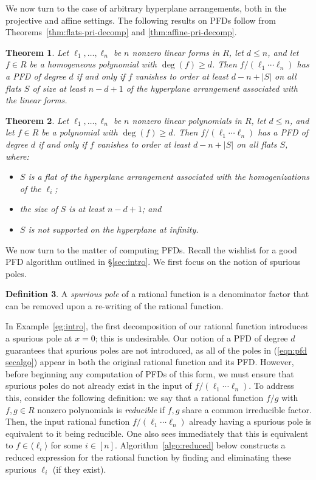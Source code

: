 \documentclass [a4paper,reqno, 11pt]{amsart}
\theoremstyle{plain}
\newtheorem{theorem}{Theorem}[section]
\theoremstyle{plain}
\theoremstyle{plain}
\theoremstyle{plain}
\theoremstyle{definition}
\newtheorem{definition}[theorem]{Definition}
\theoremstyle{definition}
\theoremstyle{definition}
\theoremstyle{definition}
\theoremstyle{definition}
\theoremstyle{definition}
\begin{document}
We now turn to the case of arbitrary hyperplane arrangements, both in the projective and affine settings. The following results on PFDs follow from Theorems~\ref{thm:flats-pri-decomp} and \ref{thm:affine-pri-decomp}.

\begin{theorem}\label{thm: PFD iff proj}
Let $\ell_1,\ldots,\ell_n$ be $n$ nonzero linear forms in $R$, let $d\leq n$, and let $f\in R$ be a homogeneous polynomial with $\deg(f)\geq d$. Then $f/(\ell_1\cdots\ell_n)$ has a PFD of degree $d$ if and only if $f$ vanishes to order at least $d-n+|S|$ on all flats $S$ of size at least $n-d+1$ of the hyperplane arrangement associated with the linear forms. 
\end{theorem}


\begin{theorem}\label{thm: PFD iff affine}
    Let $\ell_1,\ldots,\ell_n$ be $n$ nonzero linear polynomials in $R$, let $d\leq n$, and let $f\in R$ be a polynomial with $\deg(f)\geq d$. Then $f/(\ell_1\cdots\ell_n)$ has a PFD of degree $d$ if and only if $f$ vanishes to order at least $d-n+|S|$ on all flats $S$, where:
    \begin{itemize}
        \item $S$ is a flat of the hyperplane arrangement associated with the homogenizations of the $\ell_i$;
        \item the size of $S$ is at least $n-d+1$; and
        \item $S$ is not supported on the hyperplane at infinity.
    \end{itemize}
\end{theorem}


We now turn to the matter of computing PFDs. Recall the wishlist for a good PFD algorithm outlined in \S\ref{sec:intro}. We first focus on the notion of spurious poles.

\begin{definition}\label{defn:spur pole}
    A \emph{spurious pole} of a rational function is a denominator factor that can be removed upon a re-writing of the rational function.
\end{definition}

In Example~\ref{eg:intro}, the first decomposition of our rational function introduces a spurious pole at $x=0$; this is undesirable. Our notion of a PFD of degree $d$ guarantees that spurious poles are not introduced, as all of the poles in (\ref{eqn:pfd secalgo}) appear in both the original rational function and its PFD. However, before beginning any computation of PFDs of this form, we must ensure that spurious poles do not already exist in the input of $f/(\ell_1\cdots\ell_n)$.
To address this, consider the following definition: we say that a rational function $f/g$ with $f,g\in R$ nonzero polynomials is \emph{reducible} if $f,g$ share a common irreducible factor. Then, the input rational function $f/(\ell_1\cdots\ell_n)$ already having a spurious pole is equivalent to it being reducible. One also sees immediately that this is equivalent to $f\in\langle \ell_i\rangle$ for some $i\in[n]$. Algorithm~\ref{algo:reduced} below constructs a reduced expression for the rational function by finding and eliminating these spurious $\ell_i$ (if they exist).
\end{document}
